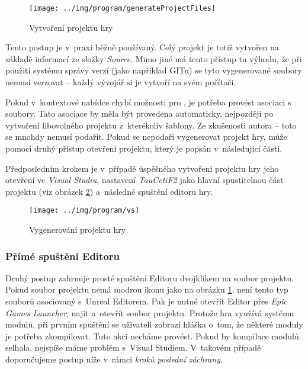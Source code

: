 \begin{figure}[!ht]\centering
\texttt{[image: ../img/program/generateProjectFiles]}

\caption{Vytvoření projektu hry}
\label{fig:generateProjectFiles}

\end{figure}
\FloatBarrier

Tento postup je v~praxi běžně používaný. Celý projekt je totiž vytvořen na základě informací ze složky \textit{Source}. Mimo jiné má tento přístup tu výhodu, že při použití systému správy verzí (jako například GITu) se tyto vygenerované soubory nemusí verzovat -- každý vývojář si je vytvoří na svém počítači.

Pokud v~kontextové nabídce chybí možnosti pro \UE{}, je potřeba provést asociaci s~ soubory. Tato asociace by měla být provedena automaticky, nejpozději po vytvoření libovolného \CPP{} projektu z~kterékoliv šablony. Ze zkušenosti autora -- toto se mnohdy nemusí podařit. Pokud se nepodaří vygenerovat projekt hry, může pomoci druhý přístup otevření projektu, který je popsán v~následující části.

Předposledním krokem je v~případě úspěšného vytvoření projektu hry jeho otevření ve \textit{Visual Studiu}, nastavení \textit{TauCetiF2} jako hlavní spustitelnou část projektu (viz obrázek \ref{fig:vs}) a~následné spuštění editoru hry.


\begin{figure}[!ht]\centering
\texttt{[image: ../img/program/vs]}

\caption{Vygenerování projektu hry}
\label{fig:vs}

\end{figure}

\FloatBarrier



\subsubsection{Přímé spuštění Editoru}
Druhý postup zahrnuje prosté spuštění Editoru dvojklikem na soubor projektu. Pokud soubor projektu nemá modrou ikonu jako na obrázku \ref{fig:generateProjectFiles}, není tento typ souborů asociovaný s~Unreal Editorem. Pak je nutné otevřít Editor přes \textit{Epic Games Launcher}, najít a~otevřít soubor projektu. Protože hra využívá systému modulů, při prvním spuštění se uživateli zobrazí hláška o~tom, že některé moduly je potřeba zkompilovat. Tuto akci necháme provést. Pokud by kompilace modulů selhala, nejspíše máme problém s~Visual Studiem. V~takovém případě doporučujeme postup níže v~rámci \textit{kroků poslední záchrany}.

